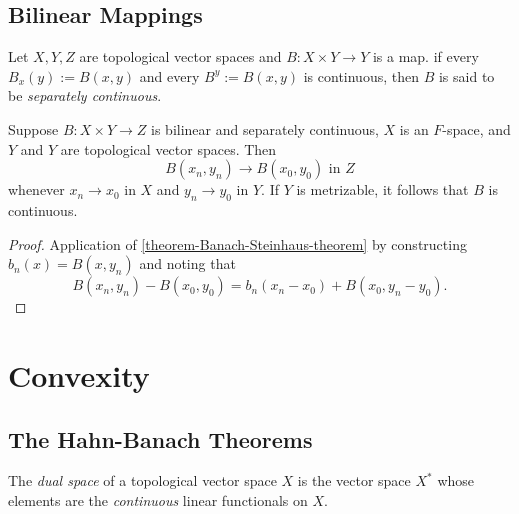 \subsection{Bilinear Mappings}
\label{subsection-bilinear-mappings}

\begin{definition}
  \label{definition-separately continuous}
  Let \( X, Y, Z \) are topological vector spaces and \( B: X \times Y \to Y \) is a map.
  if every \( B_x(y) := B(x, y) \) and every \( B^y := B(x, y) \) is continuous, then \( B \) is said to be \emph{separately continuous}.
\end{definition}

\begin{theorem}
  \label{theorem-bilinear-mapping}
  Suppose \( B: X \times Y \to Z \) is bilinear and separately continuous, \( X \) is an \( F \)-space, and \( Y \) and \( Y \) are topological vector spaces.
  Then
  \[
    B(x_n, y_n) \to B(x_0, y_0) \text{ in } Z
  \]
  whenever \( x_n \to x_0 \) in \( X \) and \( y_n \to y_0 \) in \( Y \).
  If \( Y \) is metrizable, it follows that \( B \) is continuous.
\end{theorem}
\begin{proof}
  Application of \ref{theorem-Banach-Steinhaus-theorem} by constructing \( b_n(x) = B(x, y_n) \) and noting that
  \[
    B(x_n, y_n) - B(x_0, y_0) = b_n(x_n - x_0) + B(x_0, y_n - y_0).
  \]
\end{proof}

\section{Convexity}
\label{section-convexity}

\subsection{The Hahn-Banach Theorems}

\begin{definition}
  \label{definition-dual-space-of-topological-vector-space}
  The \emph{dual space} of a topological vector space \( X \) is the vector space \( X^* \) whose elements are the \emph{continuous} linear functionals on \( X \).
\end{definition}

